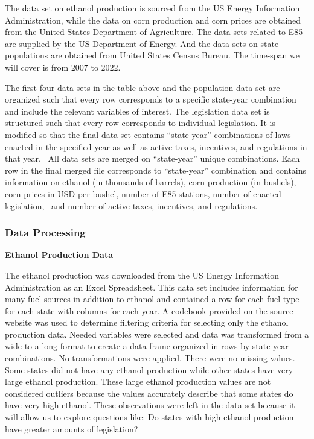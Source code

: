 \documentclass[
]{article}
\begin{document}
The data set on ethanol production is sourced from the US Energy
Information Administration, while the data on corn production and corn
prices are obtained from the United States Department of Agriculture.
The data sets related to E85 are supplied by the US Department of
Energy. And the data sets on state populations are obtained from United
States Census Bureau. The time-span we will cover is from 2007 to 2022.

The first four data sets in the table above and the population data set
are organized such that every row corresponds to a specific state-year
combination and include the relevant variables of interest. The
legislation data set is structured such that every row corresponds to
individual legislation. It is modified so that the final data set
contains ``state-year'' combinations of laws enacted in the specified
year as well as active taxes, incentives, and regulations in that year.~
All data sets are merged on ``state-year'' unique combinations. Each row
in the final merged file corresponds to ``state-year'' combination and
contains information on ethanol (in thousands of barrels), corn
production (in bushels), corn prices in USD per bushel, number of E85
stations, number of enacted legislation,~ and number of active taxes,
incentives, and regulations.

\hypertarget{data-processing}{%
\subsubsection{Data Processing}\label{data-processing}}

\textbf{Ethanol Production Data}

The ethanol production was downloaded from the US Energy Information
Administration as an Excel Spreadsheet. This data set includes
information for many fuel sources in addition to ethanol and contained a
row for each fuel type for each state with columns for each year. A
codebook provided on the source website was used to determine filtering
criteria for selecting only the ethanol production data. Needed
variables were selected and data was transformed from a wide to a long
format to create a data frame organized in rows by state-year
combinations. No transformations were applied. There were no missing
values. Some states did not have any ethanol production while other
states have very large ethanol production. These large ethanol
production values are not considered outliers because the values
accurately describe that some states do have very high ethanol. These
observations were left in the data set because it will allow us to
explore questions like: Do states with high ethanol production have
greater amounts of legislation?
\end{document}

